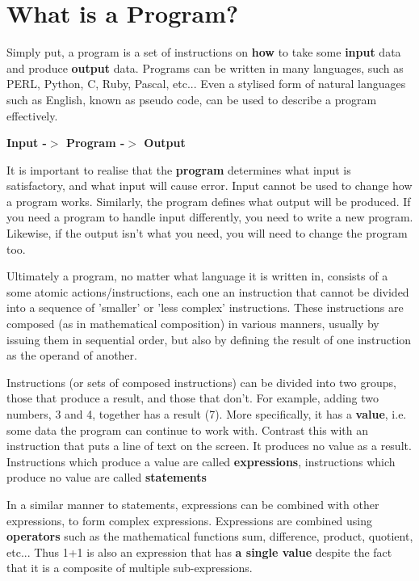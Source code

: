 \section{What is a Program?}

Simply put, a program is a set of instructions on \textbf{how} to    take some \textbf{input} data and produce    \textbf{output} data. Programs can be written in many   languages, such as PERL, Python, C, Ruby, Pascal, etc... Even a   stylised form of natural languages such as English, known as pseudo   code, can be used to describe a program effectively.

\begin{center}\textbf{Input -$>$ Program -$>$ Output}\end{center}

It is important to realise that the \textbf{program}   determines what input is satisfactory, and what input will cause error.   Input cannot be used to change how a program works. Similarly, the program   defines what output will be produced. If you need a program to handle   input differently, you need to write a new program. Likewise, if the   output isn't what you need, you will need to change the program too.

Ultimately a program, no matter what language it is written in,   consists of a some atomic actions/instructions, each one an instruction   that cannot be divided into a sequence of 'smaller' or 'less complex'   instructions. These instructions are composed (as in mathematical   composition) in various manners, usually by issuing them in sequential order,   but also by defining the result of one instruction as the operand of   another.

Instructions (or sets of composed instructions) can be divided into   two groups, those that produce a result, and those that   don't. For example, adding two numbers, 3 and 4, together has a result   (7). More specifically, it has a \textbf{value}, i.e. some data   the program can continue to work with. Contrast this with an   instruction that puts a line of text on the screen. It produces no   value as a result. Instructions which produce a value are called   \textbf{expressions}, instructions which produce no value are   called \textbf{statements}

In a similar manner to statements, expressions can be combined with   other expressions, to form complex expressions. Expressions are   combined using \textbf{operators} such as the mathematical   functions sum, difference, product, quotient, etc... Thus 1+1 is also   an expression that has \textbf{a single value} despite the fact   that it is a composite of multiple sub-expressions.

